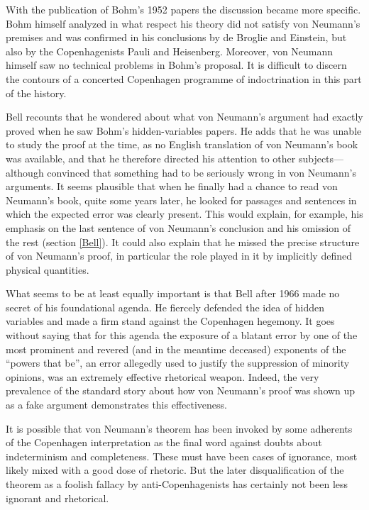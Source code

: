 \documentclass[11pt]{article}
\begin{document}
With the publication of Bohm's 1952 papers the discussion became more specific. Bohm himself analyzed in what respect his theory did not satisfy von Neumann's premises and was confirmed in his conclusions by de Broglie and Einstein, but also by the Copenhagenists Pauli and Heisenberg. Moreover, von Neumann himself saw no technical problems in Bohm's proposal. It is difficult to discern the contours of a concerted Copenhagen programme of indoctrination in this part of the history.

Bell recounts \cite{bell82} that he wondered about what von Neumann's argument had exactly proved when he saw Bohm's hidden-variables papers. He adds that he was unable to study the proof at the time, as no English translation of von Neumann's book was available, and that he therefore directed his attention to other subjects---although convinced that something had to be seriously wrong in von Neumann's arguments. It seems plausible that when he finally had a chance to read von Neumann's book, quite some years later, he looked for passages and sentences in which the expected error was clearly present. This would explain, for example, his emphasis on the last sentence of von Neumann's conclusion and his omission of the rest (section \ref{Bell}). It could also explain that he missed the precise structure of von Neumann's proof, in particular the role played in it by implicitly defined physical quantities.

What seems to be at least equally important is that Bell after 1966 made no secret of his foundational agenda. He fiercely defended the idea of hidden variables and made a firm stand against the Copenhagen hegemony. It goes without saying that for this agenda the exposure of a blatant error by one of the most prominent and revered (and in the meantime deceased) exponents of the ``powers that be'', an error allegedly used to justify the suppression of minority opinions, was an extremely effective rhetorical weapon. Indeed, the very prevalence of the standard story about how von Neumann's proof was shown up as a fake argument demonstrates this effectiveness.

It is possible that von Neumann's theorem has been invoked by some adherents of the Copenhagen interpretation as the final word against doubts about indeterminism and completeness. These must have been cases of ignorance, most likely mixed with a good dose of rhetoric. But the later disqualification of the theorem as a foolish fallacy by anti-Copenhagenists has certainly not been less ignorant and rhetorical.
\end{document}
